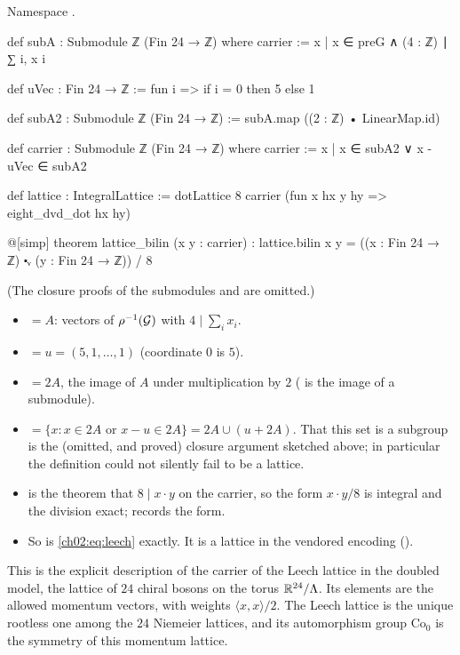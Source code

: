 \begin{definition}\label{ch02:def:leechcarrier}
Namespace .
\end{definition}
\begin{leancode}
def subA : Submodule ℤ (Fin 24 → ℤ) where
  carrier := {x | x ∈ preG ∧ (4 : ℤ) ∣ ∑ i, x i}

def uVec : Fin 24 → ℤ := fun i => if i = 0 then 5 else 1

def subA2 : Submodule ℤ (Fin 24 → ℤ) := subA.map ((2 : ℤ) • LinearMap.id)

def carrier : Submodule ℤ (Fin 24 → ℤ) where
  carrier := {x | x ∈ subA2 ∨ x - uVec ∈ subA2}

def lattice : IntegralLattice := dotLattice 8 carrier (fun x hx y hy => eight_dvd_dot hx hy)

@[simp] theorem lattice_bilin (x y : carrier) :
    lattice.bilin x y = ((x : Fin 24 → ℤ) ⬝ᵥ (y : Fin 24 → ℤ)) / 8
\end{leancode}
(The closure proofs of the submodules  and  are omitted.)
\begin{dictionary}
\begin{itemize}
\item {} $=A$: vectors of $\rho^{-1}(\mathcal{G})$ with $4\mid\sum_ix_i$.
\item {} $=u=(5,1,\dots,1)$ (coordinate $0$ is $5$).
\item {} $=2A$, the image of $A$ under multiplication by $2$ ( is the image of
  a submodule).
\item {} $=\{x: x\in2A\text{ or }x-u\in2A\}=2A\cup(u+2A)$.  That this set is a
  subgroup is the (omitted, and proved) closure argument sketched above; in particular the
  definition could not silently fail to be a lattice.
\item {} is the theorem that $8\mid x\cdot y$ on the carrier, so the form
  $x\cdot y/8$ is integral and the division exact;  records the form.
\item So  is \eqref{ch02:eq:leech} exactly.  It is a lattice in the vendored
  encoding ().
\end{itemize}
\end{dictionary}
\begin{physics}
This is the explicit description of the carrier of the Leech lattice in the doubled model, the lattice of $24$ chiral bosons on the torus $\mathbb{R}^{24}/{\Lambda}$. Its elements are the allowed momentum vectors, with weights $\langle x,x\rangle/2$. The Leech lattice is the unique rootless one among the $24$ Niemeier lattices, and its automorphism group $\mathrm{Co}_0$ is the symmetry of this momentum lattice.
\end{physics}

